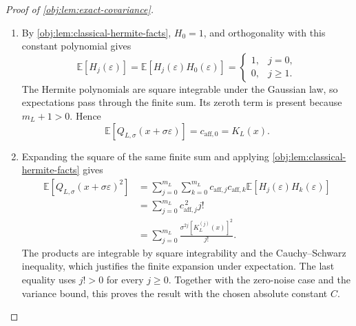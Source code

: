 \begin{proof}[Proof of \cref{obj:lem:exact-covariance}]
\begin{enumerate}
When \(j=i+2k\), this coefficient equals
\[
(-1)^k\binom ji(2k-1)!!
=
\frac{(-1/2)^k}{k!}\frac{j!}{i!}.
\]
This is exactly the coefficient of \(z^i\) in
\(\mathcal T_{j,1}(z^j)\). For \(i>j\), or for \(j-i\) odd, both coefficients are zero. Thus
\[
\mathcal T_{m_L,1}(z^j)=H_j(z)
\qquad(0\le j\le m_L).
\]

Finally, finite Taylor expansion followed by scaling gives
\[
K_L(x+\sigma z)
=
\sum_{j=0}^{m_L}
\frac{\sigma^jK_L^{(j)}(x)}{j!}\,z^j,
\qquad
c_{\mathrm{aff},j}
=
\frac{\sigma^jK_L^{(j)}(x)}{j!}.
\]
Substituting these coefficients and the transformed monomials into the preceding decomposition proves the finite identity
\[
Q_{L,\sigma}(x+\sigma z)
=
\sum_{j=0}^{m_L}
\frac{\sigma^jK_L^{(j)}(x)}{j!}\,H_j(z)
\qquad(z\in\mathbb R).
\]

\item By \cref{obj:lem:classical-hermite-facts}, \(H_0=1\), and orthogonality with this constant polynomial gives
\[
\mathbb E[H_j(\varepsilon)]
=
\mathbb E[H_j(\varepsilon)H_0(\varepsilon)]
=
\begin{cases}
1,&j=0,\\
0,&j\ge1.
\end{cases}
\]
The Hermite polynomials are square integrable under the Gaussian law, so expectations pass through the finite sum. Its zeroth term is present because \(m_L+1>0\). Hence
\[
\mathbb E[Q_{L,\sigma}(x+\sigma\varepsilon)]
=
c_{\mathrm{aff},0}
=
K_L(x).
\]

\item Expanding the square of the same finite sum and applying \cref{obj:lem:classical-hermite-facts} gives
\[
\begin{aligned}
\mathbb E[Q_{L,\sigma}(x+\sigma\varepsilon)^2]
&=
\sum_{j=0}^{m_L}\sum_{k=0}^{m_L}
c_{\mathrm{aff},j}c_{\mathrm{aff},k}
\mathbb E[H_j(\varepsilon)H_k(\varepsilon)]\\
&=
\sum_{j=0}^{m_L}c_{\mathrm{aff},j}^{\,2}j!\\
&=
\sum_{j=0}^{m_L}
\frac{\sigma^{2j}[K_L^{(j)}(x)]^2}{j!}.
\end{aligned}
\]
The products are integrable by square integrability and the Cauchy--Schwarz inequality, which justifies the finite expansion under expectation. The last equality uses \(j!>0\) for every \(j\ge0\). Together with the zero-noise case and the variance bound, this proves the result with the chosen absolute constant \(C\).
\end{enumerate}
\end{proof}

